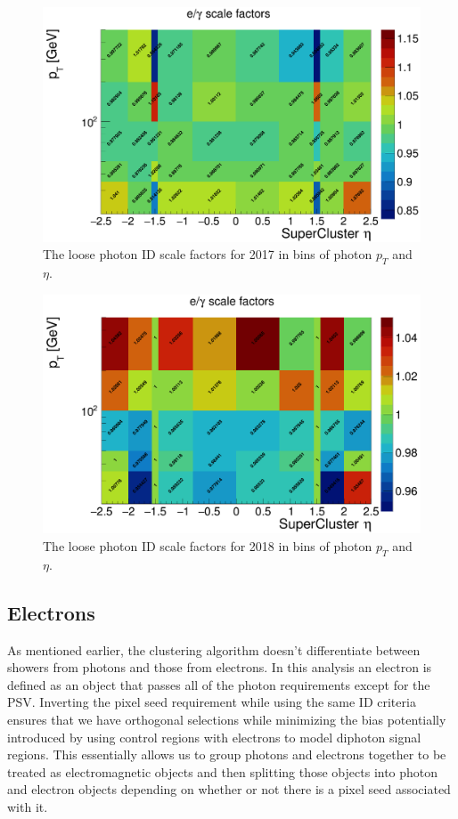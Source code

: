 \begin{figure}[h]
	\centering
	\includegraphics[width=1.0\linewidth]{Figures/LoosePhotonSF_2017}
	\caption[Scale factors fo 2017 loose photon ID.]{The loose photon ID scale factors for 2017 in bins of photon $p_T$ and $\eta$.}
	\label{fig:loosephotonsf2017}
\end{figure}
\begin{figure}[h]
	\centering
	\includegraphics[width=1.0\linewidth]{Figures/LoosePhotonSF_2018}
	\caption[Scale factors for 2018 loose photon ID.]{The loose photon ID scale factors for 2018 in bins of photon $p_T$ and $\eta$.}
	\label{fig:loosephotonsf2018}
\end{figure}


\label{section:photondefinition}

\subsection{Electrons}
As mentioned earlier, the clustering algorithm doesn't differentiate between showers from photons and those from electrons.  In this analysis an electron is defined as an object that passes all of the photon requirements except for the PSV.  Inverting the pixel seed requirement while using the same ID criteria ensures that we have orthogonal selections while minimizing the bias potentially introduced by using control regions with electrons to model diphoton signal regions.  This essentially allows us to group photons and electrons together to be treated as electromagnetic objects and then splitting those objects into photon and electron objects depending on whether or not there is a pixel seed associated with it.


